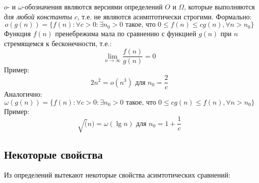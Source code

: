 \documentclass[11pt]{article}
\begin{document}
$o$- и $\omega$-обозначения являются версиями определений $O$ и $\Omega$, которые выполняются 
\emph{для любой константы $c$}, т.е. не являются асимптотически строгими. Формально:
\begin{equation*}
  o(g(n)) = \{f(n): \forall c > 0: \exists n_0 > 0 \text{ такое, что }
  0 \leqslant f(n) \leqslant c g(n), \forall n > n_0
  \}
\end{equation*}
Функция $f(n)$ пренебрежима мала по сравнению с функцией $g(n)$ при $n$ стремящемся к бесконечности, т.е.: 
\begin{equation*}
  \lim_{n\to\infty}\frac{f(n)}{g(n)} = 0
\end{equation*}
Пример:
\begin{equation*}
  2n^2 = o(n^3) \text{ для } n_0 = \frac{2}{c}
\end{equation*}
Аналогично:
\begin{equation*}
  \omega(g(n)) = \{f(n): \forall c > 0: \exists n_0 > 0 \text{ такое, что }
  0 \leqslant c g(n) \leqslant f(n), \forall n > n_0
  \}
\end{equation*}
Пример:
\begin{equation*}
  \sqrt(n) = \omega(\lg n) \text{ для } n_0 = 1 + \frac{1}{c}
\end{equation*}

\subsection{Некоторые свойства}

Из определений вытекают некоторые свойства асимтотических сравнений:
\end{document}
